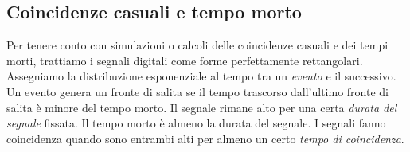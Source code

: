 \subsection{Coincidenze casuali e tempo morto}

Per tenere conto con simulazioni o calcoli delle coincidenze casuali e dei tempi morti,
trattiamo i segnali digitali come forme perfettamente rettangolari.
Assegniamo la distribuzione esponenziale al tempo tra un \emph{evento} e il successivo.
Un evento genera un fronte di salita se il tempo trascorso dall'ultimo fronte di salita
è minore del tempo morto.
Il segnale rimane alto per una certa \emph{durata del segnale} fissata.
Il tempo morto è almeno la durata del segnale.
I segnali fanno coincidenza quando sono entrambi alti per almeno un certo \emph{tempo di coincidenza}.
